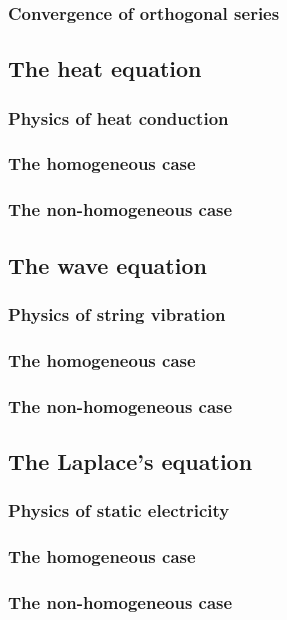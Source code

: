 \subsubsection{Convergence of orthogonal series}

\subsection{The heat equation}

\subsubsection{Physics of heat conduction}

\subsubsection{The homogeneous case}

\subsubsection{The non-homogeneous case}

\subsection{The wave equation}

\subsubsection{Physics of string vibration}

\subsubsection{The homogeneous case}

\subsubsection{The non-homogeneous case}


\subsection{The Laplace's equation}

\subsubsection{Physics of static electricity}

\subsubsection{The homogeneous case}

\subsubsection{The non-homogeneous case}